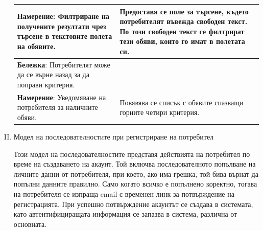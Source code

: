 \documentclass[]{article}
\begin{document}
\begin{enumerate}[I.]
{\begin{center}
\begin{tabular}{ |p{6cm}|p{10cm}| }
    \textbf{Намерение}: Филтриране на получените резултати чрез търсене в текстовите полета на обявите. & Предоставя се поле за търсене, където потребителят въвежда свободен текст. По този свободен текст се филтрират тези обяви, които го имат в полетата си. \\    \hline
    \textbf{Бележка}: Потребителят може да се върне назад за да поправи критерия. & \\    \hline
    \textbf{Намерение}: Уведомяване на потребителя за наличните обяви. & Повявява се списък с обявите спазващи горните четири критерия. \\    \hline
  \end{tabular}
\end{center}

	
	} %
	
	\item {Модел на последователностите при регистриране на потребител
	
Този модел на последователностите представя действията на потребител по време на създаването на акаунт. Той включва последователното попълване на личните данни от потребителя, при което, ако има грешка, той бива върнат да попълни данните правилно. Само когато всичко е попълнено коректно, тогава на потребителя се изпраща email с временен линк за потвърждение на регистрацията. При успешно потвърждение акаунтът се създава в системата, като автентифициращата информация се запазва в система, различна от основната.

}
\end{enumerate}
\end{document}
